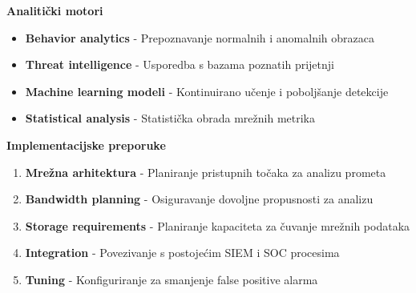 \textbf{Analitički motori}
\begin{itemize}
\item \textbf{Behavior analytics} - Prepoznavanje normalnih i anomalnih obrazaca
\item \textbf{Threat intelligence} - Usporedba s bazama poznatih prijetnji
\item \textbf{Machine learning modeli} - Kontinuirano učenje i poboljšanje detekcije
\item \textbf{Statistical analysis} - Statistička obrada mrežnih metrika
\end{itemize}

\textbf{Implementacijske preporuke}

\begin{enumerate}
\item \textbf{Mrežna arhitektura} - Planiranje pristupnih točaka za analizu prometa
\item \textbf{Bandwidth planning} - Osiguravanje dovoljne propusnosti za analizu
\item \textbf{Storage requirements} - Planiranje kapaciteta za čuvanje mrežnih podataka
\item \textbf{Integration} - Povezivanje s postojećim SIEM i SOC procesima
\item \textbf{Tuning} - Konfiguriranje za smanjenje false positive alarma
\end{enumerate}